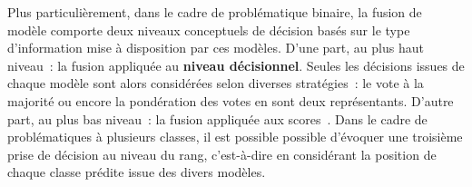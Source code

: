 Plus particulièrement, dans le cadre de problématique binaire, la fusion de modèle comporte deux niveaux conceptuels de décision basés sur le type d'information mise à disposition par ces modèles. D'une part, au plus haut niveau~: la fusion appliquée au \textbf{niveau décisionnel}. Seules les décisions issues de chaque modèle sont alors considérées selon diverses stratégies~: le vote à la majorité ou encore la pondération des votes en sont deux représentants. D'autre part, au plus bas niveau~: la fusion appliquée aux scores~\cite{Kittler1998}. Dans le cadre de problématiques à plusieurs classes, il est possible possible d'évoquer une troisième prise de décision au niveau du rang, c’est-à-dire en considérant la position de chaque classe prédite issue des divers modèles.\par


  

